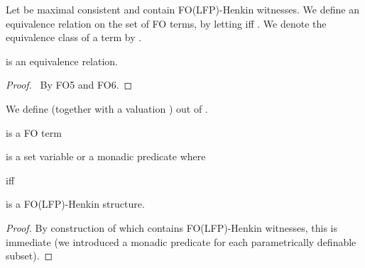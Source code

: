 \documentclass{LMCS}
\newcommand{\fo}{\textsf{FO}\xspace}
\newcommand{\folfp}{\textsf{FO(LFP)}\xspace}
\begin{document}
\begin{defi}
Let  be maximal consistent and
contain \folfp-Henkin witnesses. We define an equivalence relation on the
set of \fo terms, by letting  iff
. We denote the equivalence class of a term
 by .
\end{defi}
\begin{prop}
  is an equivalence relation.
\end{prop}
\begin{proof}\
By  FO5 and FO6.
\end{proof}



\begin{defi}
We define  (together with a valuation ) out of .
\begin{iteMize}{}
\item    is a \fo term 
\item    is a set variable or a monadic predicate where 
\item    iff 
\item   
\item   
\item   
\end{iteMize}
\end{defi}

\begin{prop}
  is a \folfp-Henkin structure.
\end{prop}

\begin{proof}
By construction of  which contains \folfp-Henkin witnesses, this is immediate (we introduced a
monadic predicate for each parametrically definable subset).
\end{proof}
\end{document}
